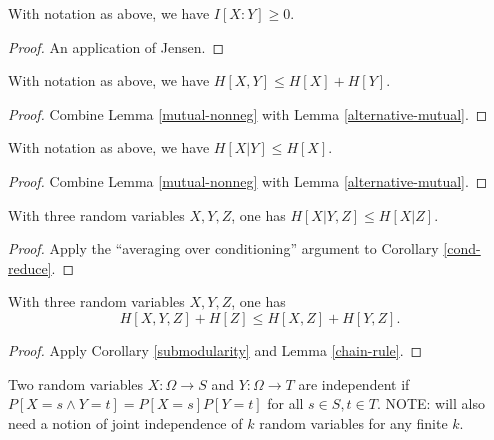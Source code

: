 \begin{lemma}\label{mutual-nonneg}  With notation as above, we have $I[X:Y] \geq 0$.
\end{lemma}

\begin{proof}  An application of Jensen.
\end{proof}

\begin{corollary}[Subadditivity]\label{subadditive}   With notation as above, we have $H[X,Y] \leq H[X] + H[Y]$.
\end{corollary}

\begin{proof}  Combine Lemma \ref{mutual-nonneg} with Lemma \ref{alternative-mutual}.
\end{proof}

\begin{corollary}\label{cond-reduce}   With notation as above, we have $H[X|Y] \leq H[X]$.
\end{corollary}

\begin{proof}  Combine Lemma \ref{mutual-nonneg} with Lemma \ref{alternative-mutual}.
\end{proof}

\begin{corollary}[Submodularity]\label{submodularity} With three random variables $X,Y,Z$, one has $H[X|Y,Z] \leq H[X|Z]$.
\end{corollary}

\begin{proof} Apply the ``averaging over conditioning'' argument to Corollary \ref{cond-reduce}.
\end{proof}

\begin{corollary}\label{alt-submodularity} With three random variables $X,Y,Z$, one has
  $$ H[X,Y,Z] + H[Z] \leq H[X,Z] + H[Y,Z].$$
\end{corollary}

\begin{proof}  Apply Corollary \ref{submodularity} and Lemma \ref{chain-rule}.
\end{proof}

\begin{definition}\label{independent-def}
Two random variables $X: \Omega \to S$ and $Y: \Omega \to T$ are independent if $P[ X = s \wedge Y = t] = P[X=s] P[Y=t]$ for all $s \in S, t \in T$.  NOTE: will also need a notion of joint independence of $k$ random variables for any finite $k$.
\end{definition}

